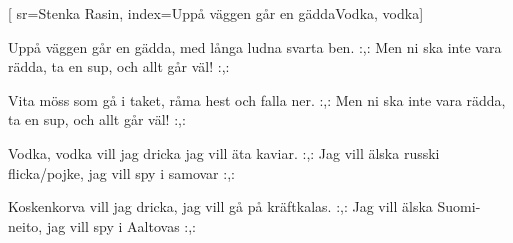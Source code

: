 [ 							
	sr={Stenka Rasin},					
	index={Uppå väggen går en gädda}{Vodka, vodka}]		
	
\beginverse*						
Uppå väggen går en gädda, 
med långa ludna svarta ben.
:,: Men ni ska inte vara rädda,
ta en sup, och allt går väl! :,:
\endverse						

\beginverse				
Vita möss som gå i taket, 
råma hest och falla ner.
:,: Men ni ska inte vara rädda,
ta en sup, och allt går väl! :,:
\endverse
				
\beginverse				
Vodka, vodka vill jag dricka
jag vill äta kaviar.
:,: Jag vill älska russki flicka/pojke, 
jag vill spy i samovar :,:
\endverse	

\beginverse				
Koskenkorva vill jag dricka,
jag vill gå på kräftkalas.
:,: Jag vill älska Suomi-neito, 
jag vill spy i Aaltovas :,:
\endverse	
\endsong	
